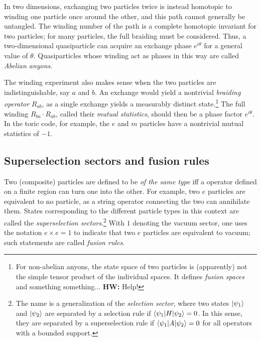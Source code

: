 \documentclass{article}
\newcommand{\hwnote}[1]{{\color{red}\textbf{HW:} #1}}
\begin{document}
In two dimensions, exchanging two particles twice is instead homotopic to
winding one particle once around the other,
and this path cannot generally be untangled.
The winding number of the path is a complete homotopic invariant for two particles;
for many particles, the full braiding must be considered.
Thus, a two-dimensional quasiparticle can acquire an exchange phase
$e^{i\theta}$ for a general value of $\theta$.
Quasiparticles whose winding act as phases in this way are called \emph{Abelian anyons}.

The winding experiment also makes sense when the two particles are indistinguishable,
say $a$ and $b$.
An exchange would yield a nontrivial \emph{braiding operator} $R_{ab}$,
as a single exchange yields a measurably distinct state.\footnote{%
For non-abelian anyons, the state space of two particles is (apparently)
not the simple tensor product of the individual spaces.
It defines \emph{fusion spaces} and something something...
\hwnote{Help!}
}
The full winding $R_{ba} \cdot R_{ab}$, called their \emph{mutual statistics},
should then be a phase factor $e^{i\theta}$.
In the toric code, for example, the $e$ and $m$ particles
have a nontrivial mutual statistics of $-1$.

\subsection{Superselection sectors and fusion rules}
Two (composite) particles are defined to be \emph{of the same type} iff
a operator defined on a finite region can turn one into the other.
For example, two $e$ particles are equivalent to no particle,
as a string operator connecting the two can annihilate them.
States corresponding to the different particle types in this context
are called the \emph{superselection sectors}.\footnote{%
The name is a generalization of the \emph{selection sector},
where two states $\ket{\psi_1}$ and $\ket{\psi_2}$ are separated by a selection rule
if $\braket{\psi_1 | H | \psi_2} = 0$.
In this sense, they are separated by a superselection rule
if $\braket{\psi_1 | A | \psi_2} = 0$ for all operators with a bounded support.
}
With $1$ denoting the vacuum sector, one uses the notation $e\times e = 1$
to indicate that two $e$ particles are equivalent to vacuum;
such statements are called \emph{fusion rules}.
\end{document}
